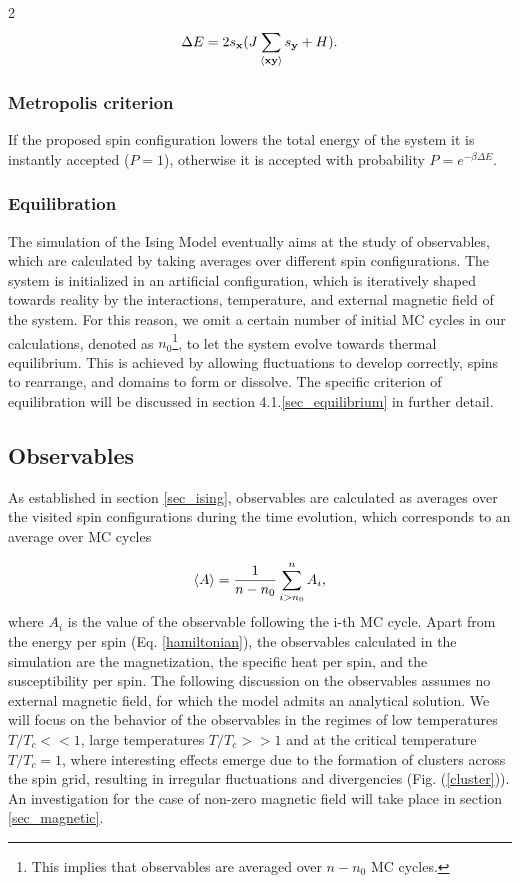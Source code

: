 \documentclass{article}
\begin{document}
\begin{multicols}{2}
\begin{align}
    \Delta E = 2s_\mathbf{x}(J\sum_{\braket{\mathbf{xy}}}s_\mathbf{y} + H).
    \label{shift}
\end{align}

\subsubsection{Metropolis criterion}

If the proposed spin configuration lowers the total energy of the system it is instantly accepted ($P=1$), otherwise it is accepted with probability $P = e^{-\beta \Delta E}$.

\subsubsection{Equilibration}

The simulation of the Ising Model eventually aims at the study of observables, which are calculated by taking averages over different spin configurations. The system is initialized in an artificial configuration, which is iteratively shaped towards reality by the interactions, temperature, and external magnetic field of the system. For this reason, we omit a certain number of initial MC cycles in our calculations, denoted as $n_0$\footnote{This implies that observables are averaged over $n-n_0$ MC cycles.}, to let the system evolve towards thermal equilibrium. This is achieved by allowing fluctuations to develop correctly, spins to rearrange, and domains to form or dissolve. The specific criterion of equilibration will be discussed in section 4.1.\ref{sec_equilibrium} in further detail. 

\subsection{Observables}

As established in section \ref{sec_ising}, observables are calculated as averages over the visited spin configurations during the time evolution, which corresponds to an average over MC cycles

\begin{align}
    \braket{A} = \frac{1}{n-n_0}\sum_{i>n_0}^{n}A_i,
    \label{observables}
\end{align}
%
where $A_i$ is the value of the observable following the i-th MC cycle. Apart from the energy per spin (Eq. \eqref{hamiltonian}), the observables calculated in the simulation are the magnetization, the specific heat per spin, and the susceptibility per spin. The following discussion on the observables assumes no external magnetic field, for which the model admits an analytical solution. We will focus on the behavior of the observables in the regimes of low temperatures $T/T_c<<1$, large temperatures $T/T_c>>1$ and at the critical temperature $T/T_c=1$, where interesting effects emerge due to the formation of clusters across the spin grid, resulting in irregular fluctuations and divergencies (Fig. (\ref{cluster})). An investigation for the case of non-zero magnetic field will take place in section \ref{sec_magnetic}.


\end{multicols}
\end{document}
